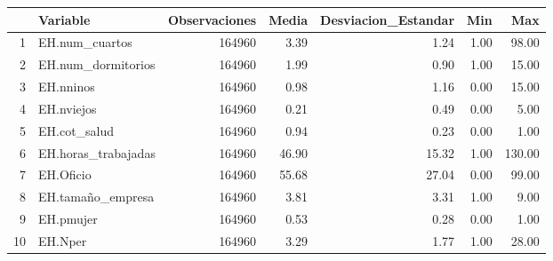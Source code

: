 \begin{table}[ht]
\centering
\begin{tabular}{rlrrrrr}
  \hline
 & Variable & Observaciones & Media & Desviacion\_Estandar & Min & Max \\ 
  \hline
1 & EH.num\_cuartos & 164960 & 3.39 & 1.24 & 1.00 & 98.00 \\ 
  2 & EH.num\_dormitorios & 164960 & 1.99 & 0.90 & 1.00 & 15.00 \\ 
  3 & EH.nninos & 164960 & 0.98 & 1.16 & 0.00 & 15.00 \\ 
  4 & EH.nviejos & 164960 & 0.21 & 0.49 & 0.00 & 5.00 \\ 
  5 & EH.cot\_salud & 164960 & 0.94 & 0.23 & 0.00 & 1.00 \\ 
  6 & EH.horas\_trabajadas & 164960 & 46.90 & 15.32 & 1.00 & 130.00 \\ 
  7 & EH.Oficio & 164960 & 55.68 & 27.04 & 0.00 & 99.00 \\ 
  8 & EH.tamaño\_empresa & 164960 & 3.81 & 3.31 & 1.00 & 9.00 \\ 
  9 & EH.pmujer & 164960 & 0.53 & 0.28 & 0.00 & 1.00 \\ 
  10 & EH.Nper & 164960 & 3.29 & 1.77 & 1.00 & 28.00 \\ 
   \hline
\end{tabular}
\end{table}
